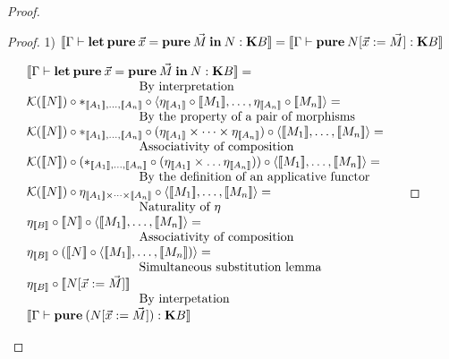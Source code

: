 \documentclass[a4paper]{article}
\begin{document}
\begin{proof}
\begin{proof}
\vspace{\baselineskip}

1) $[\![\Gamma \vdash {\bf let \: pure \:} \vec{x} = {\bf pure \:} \vec{M} {\: \bf in \:} N : {\bf K}B]\!] = [\![\Gamma \vdash {\bf pure \:} N [\vec{x} := \vec{M}] : {\bf K}B]\!]$

\vspace{\baselineskip}

$\begin{array}{lll}
&[\![\Gamma \vdash {\bf let \: pure \:} \vec{x} = {\bf pure \:} \vec{M} {\: \bf in \:} N : {\bf K}B]\!] = & \\
&\text{\quad\quad\quad\quad\quad\quad\quad\quad\quad By interpretation}& \\
&\mathcal{K}([\![N]\!]) \circ \ast_{[\![A_1]\!],\dots,[\![A_n]\!]} \circ \langle \eta_{[\![A_1]\!]} \circ [\![M_1]\!],\dots,\eta_{[\![A_n]\!]} \circ [\![M_n]\!] \rangle = \\
&\text{\quad\quad\quad\quad\quad\quad\quad\quad\quad By the property of a pair of morphisms}& \\
&\mathcal{K}([\![N]\!]) \circ \ast_{[\![A_1]\!],\dots,[\![A_n]\!]} \circ (\eta_{[\![A_1]\!]} \times \dots \times \eta_{[\![A_n]\!]}) \circ \langle [\![M_1]\!], \dots, [\![M_n]\!]\rangle =& \\
&\text{\quad\quad\quad\quad\quad\quad\quad\quad\quad Associativity of composition}& \\
&\mathcal{K}([\![N]\!]) \circ (\ast_{[\![A_1]\!],\dots,[\![A_n]\!]} \circ (\eta_{[\![A_1]\!]} \times \dots \eta_{[\![A_n]\!]})) \circ \langle [\![M_1]\!], \dots, [\![M_n]\!] \rangle =& \\
&\text{\quad\quad\quad\quad\quad\quad\quad\quad\quad By the definition of an applicative functor}& \\
&\mathcal{K}([\![N]\!]) \circ \eta_{[\![A_1]\!] \times \dots \times [\![A_n]\!]} \circ \langle [\![M_1]\!], \dots, [\![M_n]\!] \rangle =& \\
&\text{\quad\quad\quad\quad\quad\quad\quad\quad\quad Naturality of $\eta$}& \\
&\eta_{[\![B]\!]} \circ [\![N]\!] \circ \langle [\![M_1]\!], \dots, [\![M_n]\!] \rangle =& \\
&\text{\quad\quad\quad\quad\quad\quad\quad\quad\quad Associativity of composition}& \\
&\eta_{[\![B]\!]} \circ ([\![N]\!] \circ \langle [\![M_1]\!], \dots, [\![M_n]\!]) \rangle =& \\
&\text{\quad\quad\quad\quad\quad\quad\quad\quad\quad Simultaneous substitution lemma}& \\
&\eta_{[\![B]\!]} \circ [\![N [\vec{x} := \vec{M}]]\!]& \\
&\text{\quad\quad\quad\quad\quad\quad\quad\quad\quad By interpetation}& \\
&[\![\Gamma \vdash {\bf pure \:} (N [\vec{x} := \vec{M}]) : {\bf K}B]\!]&
\end{array}$


\end{proof}
\end{proof}
\end{document}

